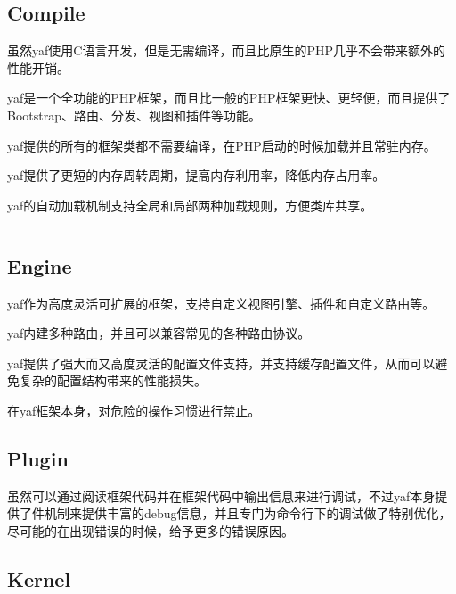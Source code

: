 \begin{lstlisting}[language=PHP]

\end{lstlisting}





\subsection{Compile}

虽然yaf使用C语言开发，但是无需编译，而且比原生的PHP几乎不会带来额外的性能开销。

yaf是一个全功能的PHP框架，而且比一般的PHP框架更快、更轻便，而且提供了Bootstrap、路由、分发、视图和插件等功能。

yaf提供的所有的框架类都不需要编译，在PHP启动的时候加载并且常驻内存。

yaf提供了更短的内存周转周期，提高内存利用率，降低内存占用率。

yaf的自动加载机制支持全局和局部两种加载规则，方便类库共享。


\begin{lstlisting}[language=PHP]

\end{lstlisting}


\subsection{Engine}

yaf作为高度灵活可扩展的框架，支持自定义视图引擎、插件和自定义路由等。

yaf内建多种路由，并且可以兼容常见的各种路由协议。

yaf提供了强大而又高度灵活的配置文件支持，并支持缓存配置文件，从而可以避免复杂的配置结构带来的性能损失。

在yaf框架本身，对危险的操作习惯进行禁止。

\subsection{Plugin}

虽然可以通过阅读框架代码并在框架代码中输出信息来进行调试，不过yaf本身提供了件机制来提供丰富的debug信息，并且专门为命令行下的调试做了特别优化，尽可能的在出现错误的时候，给予更多的错误原因。


\subsection{Kernel}

